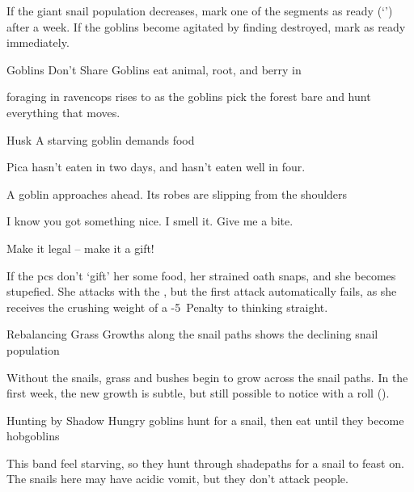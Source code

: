 \begin{multicols}{2}
\label{goblinsRise}

\renewcommand\enchantedRations{empty bowl}

If the giant snail population decreases, mark one of the \glspl{segment} as ready (`\sgr') after a week.
If the goblins become agitated by finding  destroyed, mark  as ready immediately.

\setcounter{segNo}{-1}
{Goblins Don't Share}%
{Goblins eat animal, root, and berry in }%

\Gls{foraging} in \gls{ravencops} rises to \tn[16] as the goblins pick the forest bare and hunt everything that moves.

{Husk}%
{A starving goblin demands food}%

Pica hasn't eaten in two days, and hasn't eaten well in four.

\begin{boxtext}
  A goblin approaches ahead.
  Its robes are slipping from the shoulders
\end{boxtext}

\begin{speechtext}
  I know you got something nice.
  I smell it.
  Give me a bite.

  Make it legal -- make it a gift!
\end{speechtext}

If the \glspl{pc} don't `gift' her some food, her strained oath snaps, and she becomes stupefied.
She attacks with the \weaponName, but the first attack automatically fails, as she receives the crushing weight of a -5~Penalty to thinking straight.

%

{Rebalancing Grass}%
{Growths along the snail paths shows the declining snail population}%

Without the snails, grass and bushes begin to grow across the snail paths.
In the first week, the new growth is subtle, but still possible to notice with a  roll (\tn[12]).

{Hunting by Shadow}%
{Hungry goblins hunt for a snail, then eat until they become hobgoblins}%

This band feel starving, so they hunt through \gls{shadepaths} for a snail to feast on.
The snails here may have acidic vomit, but they don't attack people.


\end{multicols}

